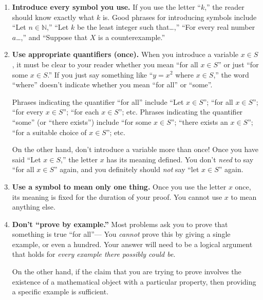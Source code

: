 \begin{enumerate}
\item \textbf{Introduce every symbol you use.}
        If you use the letter ``$k$,'' the reader should know exactly what $k$ is.
        Good phrases for introducing symbols include
          ``Let $n\in \mathbb{N}$,''
          ``Let $k$ be the least integer such that\ldots,''
          ``For every real number $a$\ldots,''
          and
          ``Suppose that $X$ is a counterexample.''
          
\item \textbf{Use appropriate quantifiers (once).}
        When you introduce a variable $x\in S$, 
        it must be clear to your reader whether you mean ``for all $x\in S$''
        or just ``for some $x\in S$.''
        If you just say something like ``$y=x^2$ where $x\in S$,''
        the word ``where'' doesn't indicate whether you mean ``for all'' or ``some''.
        
        Phrases indicating the quantifier ``for all'' include 
           ``Let $x\in S$'';
           ``for all $x\in S$'';
           ``for every $x\in S$'';
           ``for each $x\in S$''; etc.
        Phrases indicating the quantifier ``some'' (or ``there exists'') include
           ``for some $x\in S$'';
           ``there exists an $x\in S$'';
           ``for a suitable choice of $x\in S$''; etc.
        
        On the other hand, don't introduce a variable more than once!
        Once you have said ``Let $x\in S$,''
        the letter $x$ has its meaning defined.
        You don't \emph{need} to say ``for all $x\in S$'' again,
        and you definitely should \emph{not} say ``let $x\in S$'' again.

\item \textbf{Use a symbol to mean only one thing.}
        Once you use the letter $x$ once,
        its meaning is fixed for the duration of your proof.
        You cannot use $x$ to mean anything else.

\item \textbf{Don't ``prove by example.''}\label{pfbyexample}
        Most problems ask you to prove that something is true ``for all''---%
        You \emph{cannot} prove this by giving a single example, or even a hundred.
        Your answer will need to be a logical argument that holds for \emph{every example there possibly could be}.

On the other hand, if the claim that you are trying to prove involves the existence of a mathematical object with a particular property, then providing a specific example is sufficient.
        

\end{enumerate}
